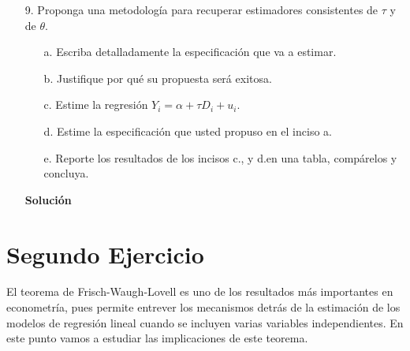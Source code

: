 \documentclass[a4paper, answers, addpoints, 11pt]{exam}
\begin{document}
\begin{itemize}
\begin{mdframed}
\begin{proof}
\begin{align*}
      &= \tau +\theta + \text{plim} E[x_i x_i'] ^{-1} 0 \qquad \text{(usando exogeneidad débil) }\\
       &= \tau +\theta
    \end{align*}
   Como $\theta > 0$ entonces se tiene que $\text{plim } \hat{\tau}^*_{MCO}=\tau + \theta >\tau$.
        \end{proof}
        Ahora, como empíricamente obtuvimos $\hat{\tau}^*_{MCO} \approx 5.16$ y teóricamente $\tau \approx 4$ entonces el tenemos que el sesgo $\theta$ es $\approx 1.16$, Esto es consistente con los resultados obtenidos en cuanto el estimador empírico es mayor que el estimador teórico.
        \end{mdframed}

    \item[9.] Proponga una metodología para recuperar estimadores consistentes de $\tau$ y de $\theta$. 

    \begin{itemize}
        \item[a.] Escriba detalladamente la especificación que va a estimar.

        \item[b.] Justifique por qué su propuesta será exitosa.

        \item[c.] Estime la regresión $Y_i = \alpha + \tau D_i + u_i$.

        \item[d.] Estime la especificación que usted propuso en el inciso a.

        \item[e.] Reporte los resultados de los incisos c., y d.en una tabla, compárelos y concluya. 

    \end{itemize}
     \begin{mdframed}
        \textbf{Solución}
        \end{mdframed}
    

\end{itemize}
\bigskip



\section*{Segundo Ejercicio}
El teorema de Frisch-Waugh-Lovell es uno de los resultados más importantes en econometría, pues permite entrever los mecanismos detrás de la estimación de los modelos de regresión lineal cuando se incluyen varias variables independientes. En este punto vamos a estudiar las implicaciones de este teorema.
\end{document}
